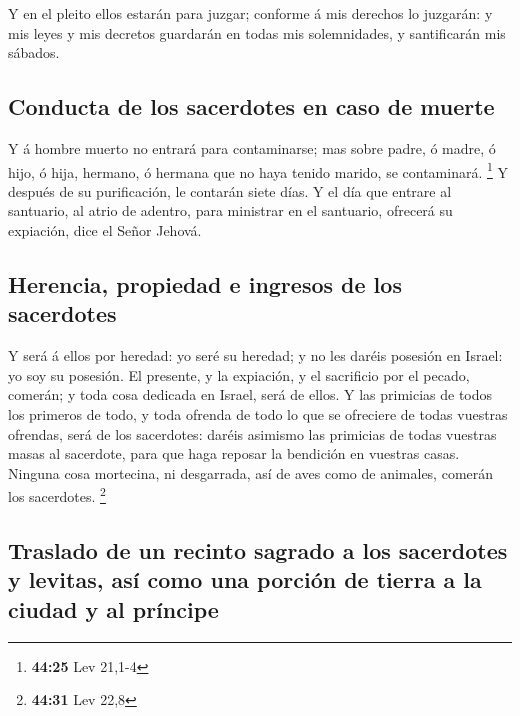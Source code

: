  Y en el pleito ellos estarán para juzgar; conforme á mis
derechos lo juzgarán: y mis leyes y mis decretos guardarán en todas mis
solemnidades, y santificarán mis sábados.

\hypertarget{conducta-de-los-sacerdotes-en-caso-de-muerte}{%
\subsection{Conducta de los sacerdotes en caso de
muerte}\label{conducta-de-los-sacerdotes-en-caso-de-muerte}}

 Y á hombre muerto no entrará para contaminarse; mas sobre
padre, ó madre, ó hijo, ó hija, hermano, ó hermana que no haya tenido
marido, se contaminará. \footnote{\textbf{44:25} Lev 21,1-4}
 Y después de su purificación, le contarán siete días.
 Y el día que entrare al santuario, al atrio de adentro,
para ministrar en el santuario, ofrecerá su expiación, dice el Señor
Jehová.

\hypertarget{herencia-propiedad-e-ingresos-de-los-sacerdotes}{%
\subsection{Herencia, propiedad e ingresos de los
sacerdotes}\label{herencia-propiedad-e-ingresos-de-los-sacerdotes}}

 Y será á ellos por heredad: yo seré su heredad; y no les
daréis posesión en Israel: yo soy su posesión.  El
presente, y la expiación, y el sacrificio por el pecado, comerán; y toda
cosa dedicada en Israel, será de ellos.  Y las primicias de
todos los primeros de todo, y toda ofrenda de todo lo que se ofreciere
de todas vuestras ofrendas, será de los sacerdotes: daréis asimismo las
primicias de todas vuestras masas al sacerdote, para que haga reposar la
bendición en vuestras casas.  Ninguna cosa mortecina, ni
desgarrada, así de aves como de animales, comerán los sacerdotes.
\footnote{\textbf{44:31} Lev 22,8}

\hypertarget{traslado-de-un-recinto-sagrado-a-los-sacerdotes-y-levitas-asuxed-como-una-porciuxf3n-de-tierra-a-la-ciudad-y-al-pruxedncipe}{%
\subsection{Traslado de un recinto sagrado a los sacerdotes y levitas,
así como una porción de tierra a la ciudad y al
príncipe}\label{traslado-de-un-recinto-sagrado-a-los-sacerdotes-y-levitas-asuxed-como-una-porciuxf3n-de-tierra-a-la-ciudad-y-al-pruxedncipe}}

